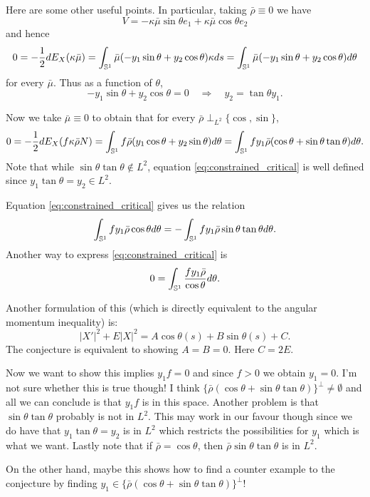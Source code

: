 \documentclass[12pt]{article}
\begin{document}
\begin{rem}
{\color{red} Here are some other useful points.}
In particular, taking \(\bar{\rho} \equiv 0\) we have
\[
V = -\kappa\bar{\mu}\sin\theta e_1 + \kappa\bar{\mu}\cos\theta e_2
\]
and hence
\[
0 = -\frac{1}{2} dE_X(\kappa\bar{\mu}) = \int_{\operatorname{\mathbb{S}^1}} \bar{\mu}(-y_1 \sin\theta + y_2 \cos\theta) \kappa ds = \int_{\operatorname{\mathbb{S}^1}} \bar{\mu}(-y_1 \sin\theta + y_2 \cos\theta) d\theta
\]
for every \(\bar{\mu}\). Thus as a function of \(\theta\),
\[
-y_1 \sin\theta + y_2 \cos\theta = 0 \quad \Rightarrow \quad y_2 = \tan\theta y_1.
\]

Now we take \(\bar{\mu} \equiv 0\) to obtain that for every \(\bar{\rho} \perp_{L^2} \{\cos,\sin\}\),
\begin{equation}
\label{eq:constrained_critical}
0 = -\frac{1}{2} dE_X(f\kappa\bar{\rho} N) = \int_{\operatorname{\mathbb{S}^1}} f\bar{\rho}(y_1 \cos\theta + y_2 \sin\theta) d\theta = \int_{\operatorname{\mathbb{S}^1}} f y_1 \bar{\rho}(\cos\theta + \sin\theta\tan\theta) d\theta.
\end{equation}
Note that while \(\sin\theta\tan\theta \notin L^2\), equation \eqref{eq:constrained_critical} is well defined since \(y_1 \tan\theta = y_2 \in L^2\).

Equation \eqref{eq:constrained_critical} gives us the relation
\[
\int_{\operatorname{\mathbb{S}^1}} f y_1 \bar{\rho} \cos\theta d\theta = - \int_{\operatorname{\mathbb{S}^1}} f y_1 \bar{\rho} \sin\theta\tan\theta d\theta.
\]
Another way to express \eqref{eq:constrained_critical} is
\[
0 = \int_{\operatorname{\mathbb{S}^1}} \frac{f y_1 \bar{\rho}}{\cos\theta} d\theta.
\]

\begin{rem}
Another formulation of this (which is directly equivalent to the angular momentum inequality) is:
$$ |X'|^2  + E|X|^2= A \cos \theta(s) + B\sin\theta(s) + C.$$
The conjecture is equivalent to showing $A=B=0$.   Here $C=2E$.
\end{rem}

{\color{red} Now we want to show this implies $y_1f = 0$ and since \(f > 0\) we obtain \(y_1 = 0\). I'm not sure whether this is true though! I think \(\{\bar{\rho}(\cos\theta + \sin\theta\tan\theta)\}^{\perp} \ne \emptyset\) and all we can conclude is that \(y_1 f\) is in this space. Another problem is that \(\sin\theta\tan\theta\) probably is not in \(L^2\). This may work in our favour though since we do have that \(y_1 \tan\theta = y_2\) is in \(L^2\) which restricts the possibilities for \(y_1\) which is what we want. Lastly note that if \(\bar{\rho} = \cos\theta\), then \(\bar{\rho} \sin\theta\tan\theta\) is in \(L^2\).

On the other hand, maybe this shows how to find a counter example to the conjecture by finding \(y_1 \in \{\bar{\rho}(\cos\theta + \sin\theta\tan\theta)\}^{\perp}\)!}
\end{rem}
\end{document}
